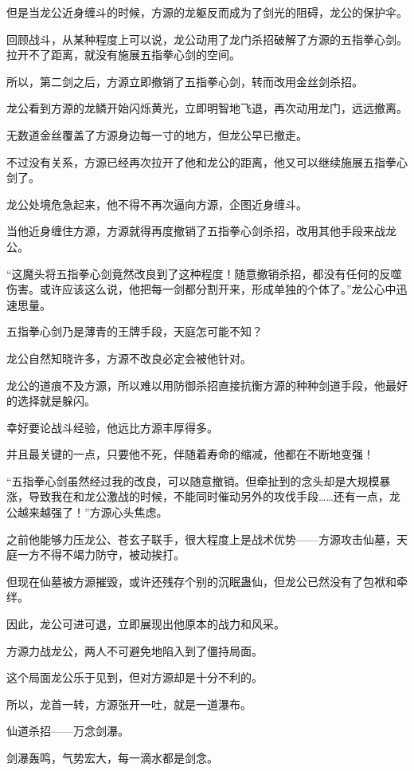\begin{this_body}
但是当龙公近身缠斗的时候，方源的龙躯反而成为了剑光的阻碍，龙公的保护伞。

回顾战斗，从某种程度上可以说，龙公动用了龙门杀招破解了方源的五指拳心剑。拉开不了距离，就没有施展五指拳心剑的空间。

所以，第二剑之后，方源立即撤销了五指拳心剑，转而改用金丝剑杀招。

龙公看到方源的龙鳞开始闪烁黄光，立即明智地飞退，再次动用龙门，远远撤离。

无数道金丝覆盖了方源身边每一寸的地方，但龙公早已撤走。

不过没有关系，方源已经再次拉开了他和龙公的距离，他又可以继续施展五指拳心剑了。

龙公处境危急起来，他不得不再次逼向方源，企图近身缠斗。

当他近身缠住方源，方源就得再度撤销了五指拳心剑杀招，改用其他手段来战龙公。

“这魔头将五指拳心剑竟然改良到了这种程度！随意撤销杀招，都没有任何的反噬伤害。或许应该这么说，他把每一剑都分割开来，形成单独的个体了。”龙公心中迅速思量。

五指拳心剑乃是薄青的王牌手段，天庭怎可能不知？

龙公自然知晓许多，方源不改良必定会被他针对。

龙公的道痕不及方源，所以难以用防御杀招直接抗衡方源的种种剑道手段，他最好的选择就是躲闪。

幸好要论战斗经验，他远比方源丰厚得多。

并且最关键的一点，只要他不死，伴随着寿命的缩减，他都在不断地变强！

“五指拳心剑虽然经过我的改良，可以随意撤销。但牵扯到的念头却是大规模暴涨，导致我在和龙公激战的时候，不能同时催动另外的攻伐手段……还有一点，龙公越来越强了！”方源心头焦虑。

之前他能够力压龙公、苍玄子联手，很大程度上是战术优势——方源攻击仙墓，天庭一方不得不竭力防守，被动挨打。

但现在仙墓被方源摧毁，或许还残存个别的沉眠蛊仙，但龙公已然没有了包袱和牵绊。

因此，龙公可进可退，立即展现出他原本的战力和风采。

方源力战龙公，两人不可避免地陷入到了僵持局面。

这个局面龙公乐于见到，但对方源却是十分不利的。

所以，龙首一转，方源张开一吐，就是一道瀑布。

仙道杀招——万念剑瀑。

剑瀑轰鸣，气势宏大，每一滴水都是剑念。


\end{this_body}
